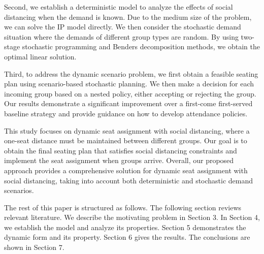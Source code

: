 Second, we establish a deterministic model to analyze the effects of social distancing when the demand is known. Due to the medium size of the problem, we can solve the IP model directly. We then consider the stochastic demand situation where the demands of different group types are random. By using two-stage stochastic programming and Benders decomposition methods, we obtain the optimal linear solution.

Third, to address the dynamic scenario problem, we first obtain a feasible seating plan using scenario-based stochastic planning. We then make a decision for each incoming group based on a nested policy, either accepting or rejecting the group. Our results demonstrate a significant improvement over a first-come first-served baseline strategy and provide guidance on how to develop attendance policies.

This study focuses on dynamic seat assignment with social distancing, where a one-seat distance must be maintained between different groups. Our goal is to obtain the final seating plan that satisfies social distancing constraints and implement the seat assignment when groups arrive. Overall, our proposed approach provides a comprehensive solution for dynamic seat assignment with social distancing, taking into account both deterministic and stochastic demand scenarios.




The rest of this paper is structured as follows. The following section reviews relevant literature. We describe the motivating problem in Section 3. In Section 4, we establish the model and analyze its properties. Section 5 demonstrates the dynamic form and its property. Section 6 gives the results. The conclusions are shown in Section 7.

\newpage
